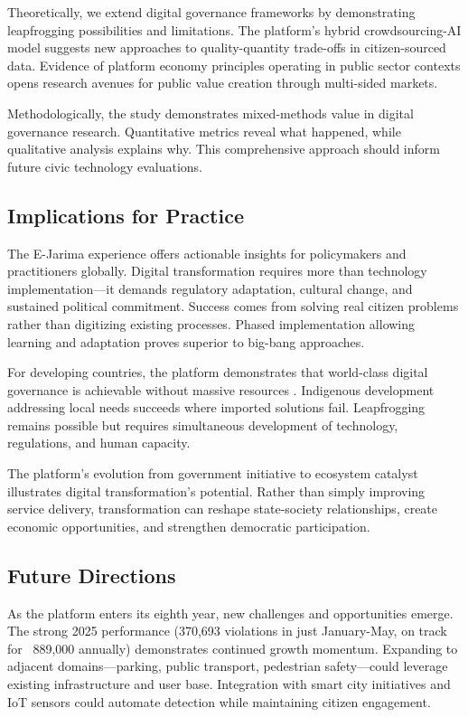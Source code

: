 \documentclass[pdflatex,sn-mathphys-num]{sn-jnl}%
\theoremstyle{thmstyleone}%
\theoremstyle{thmstyletwo}%
\theoremstyle{thmstylethree}%
\begin{document}
Theoretically, we extend digital governance frameworks by demonstrating leapfrogging possibilities and limitations. The platform's hybrid crowdsourcing-AI model suggests new approaches to quality-quantity trade-offs in citizen-sourced data. Evidence of platform economy principles operating in public sector contexts opens research avenues for public value creation through multi-sided markets.

Methodologically, the study demonstrates mixed-methods value in digital governance research. Quantitative metrics reveal what happened, while qualitative analysis explains why. This comprehensive approach should inform future civic technology evaluations.

\subsection{Implications for Practice}\label{subsec25}

The E-Jarima experience offers actionable insights for policymakers and practitioners globally. Digital transformation requires more than technology implementation—it demands regulatory adaptation, cultural change, and sustained political commitment. Success comes from solving real citizen problems rather than digitizing existing processes. Phased implementation allowing learning and adaptation proves superior to big-bang approaches.

For developing countries, the platform demonstrates that world-class digital governance is achievable without massive resources \cite{heeks2018ict4d,basu2004egovernment}. Indigenous development addressing local needs succeeds where imported solutions fail. Leapfrogging remains possible but requires simultaneous development of technology, regulations, and human capacity.

The platform's evolution from government initiative to ecosystem catalyst illustrates digital transformation's potential. Rather than simply improving service delivery, transformation can reshape state-society relationships, create economic opportunities, and strengthen democratic participation.

\subsection{Future Directions}\label{subsec26}

As the platform enters its eighth year, new challenges and opportunities emerge. The strong 2025 performance (370,693 violations in just January-May, on track for ~889,000 annually) demonstrates continued growth momentum. Expanding to adjacent domains—parking, public transport, pedestrian safety—could leverage existing infrastructure and user base. Integration with smart city initiatives and IoT sensors could automate detection while maintaining citizen engagement.
\end{document}
